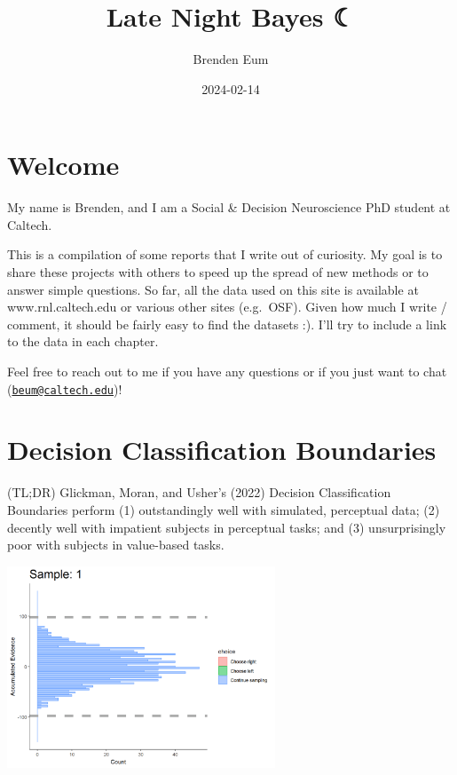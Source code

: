 \documentclass[
]{book}
\title{Late Night Bayes ☾}
\author{Brenden Eum}
\date{2024-02-14}
\begin{document}
\maketitle

{
\setcounter{tocdepth}{1}
\tableofcontents
}
\hypertarget{welcome}{%
\chapter{Welcome}\label{welcome}}

My name is Brenden, and I am a Social \& Decision Neuroscience PhD student at Caltech.

This is a compilation of some reports that I write out of curiosity. My goal is to share these projects with others to speed up the spread of new methods or to answer simple questions. So far, all the data used on this site is available at www.rnl.caltech.edu or various other sites (e.g.~OSF). Given how much I write / comment, it should be fairly easy to find the datasets :). I'll try to include a link to the data in each chapter.

Feel free to reach out to me if you have any questions or if you just want to chat (\href{mailto:beum@caltech.edu}{\nolinkurl{beum@caltech.edu}})!

\hypertarget{dcb}{%
\chapter{Decision Classification Boundaries}\label{dcb}}

(TL;DR) Glickman, Moran, and Usher's (2022) Decision Classification Boundaries perform (1) outstandingly well with simulated, perceptual data; (2) decently well with impatient subjects in perceptual tasks; and (3) unsurprisingly poor with subjects in value-based tasks.

\includegraphics[width=0.6\textwidth,height=\textheight]{images/dcb-collapsingbounds.gif}
\end{document}
